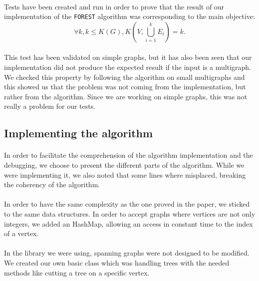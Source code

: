 
\paragraph{}
Tests have been created and run in order to prove that the result of our
implementation of the \verb!FOREST! algorithm was corresponding to the main
objective:
$$\forall k, k \leq K(G),K(V,\bigcup \limits_{i=1}^k E_i) = k.$$

\paragraph{}
This test has been validated on simple graphs, but it has also been seen that
our implementation did not produce the expected result if the input is a
multigraph. We checked this property by following the algorithm on small
multigraphs and this showed us that the problem was not coming from the
implementation, but rather from the algorithm. Since we are working on simple
graphs, this was not really a problem for our tests.

\subsection{Implementing the algorithm}
\paragraph{}
In order to facilitate the comprehension of the algorithm implementation and
the debugging, we choose to present the different parts of the algorithm. While
we were implementing it, we also noted that some lines where misplaced, breaking
the coherency of the algorithm.

\paragraph{}
In order to have the same complexity as the one proved in the paper, we sticked
to the same data structures. In order to accept graphs where vertices are not
only integers, we added an HashMap, allowing an access in constant time to the
index of a vertex.

\paragraph{}
In the library we were using, spanning graphs were not designed to be modified.
We created our own basic class which was handling trees with the needed methods
like cutting a tree on a specific vertex.

